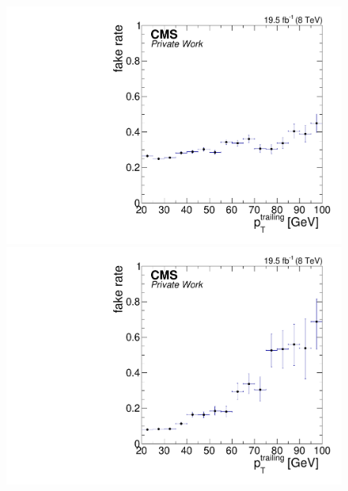 \begin{figure}[htbp]
\centering
\begin{minipage}[t]{0.49\textwidth}
  \includegraphics[width=\textwidth]{plots/BG/nonPrompt/fakeRate_ele_Inclusive_Full2012_TrailingPt_range100.pdf}
\end{minipage}
\begin{minipage}[t]{0.49\textwidth}
\includegraphics[width=\textwidth]{plots/BG/nonPrompt/fakeRate_mu_Inclusive_Full2012_TrailingPt_range100.pdf}
\end{minipage}
\begin{minipage}[t]{0.49\textwidth}

\end{minipage}
\end{figure}
